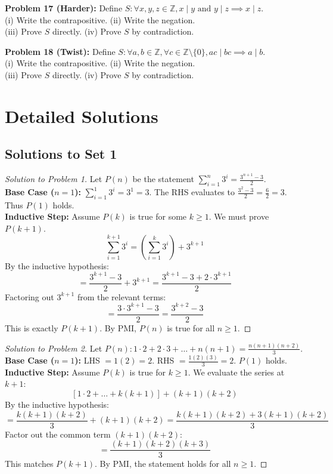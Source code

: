 \documentclass{article}
\begin{document}
\noindent\textbf{Problem 17 (Harder):} Define $S: \forall x,y,z \in \mathbb{Z}, x \mid y \text{ and } y \mid z \implies x \mid z$. \\
(i) Write the contrapositive. (ii) Write the negation. \\
(iii) Prove $S$ directly. (iv) Prove $S$ by contradiction.

\noindent\textbf{Problem 18 (Twist):} Define $S: \forall a,b \in \mathbb{Z}, \forall c \in \mathbb{Z} \setminus \{0\}, ac \mid bc \implies a \mid b$. \\
(i) Write the contrapositive. (ii) Write the negation. \\
(iii) Prove $S$ directly. (iv) Prove $S$ by contradiction.

\newpage
\section{Detailed Solutions}

\subsection{Solutions to Set 1}
\begin{proof}[Solution to Problem 1]
Let $P(n)$ be the statement $\sum_{i=1}^n 3^i = \frac{3^{n+1}-3}{2}$. \\
\textbf{Base Case ($n=1$):} $\sum_{i=1}^1 3^i = 3^1 = 3$. The RHS evaluates to $\frac{3^2-3}{2} = \frac{6}{2} = 3$. Thus $P(1)$ holds. \\
\textbf{Inductive Step:} Assume $P(k)$ is true for some $k \ge 1$. We must prove $P(k+1)$.
\[ \sum_{i=1}^{k+1} 3^i = \left( \sum_{i=1}^k 3^i \right) + 3^{k+1} \]
By the inductive hypothesis:
\[ = \frac{3^{k+1}-3}{2} + 3^{k+1} = \frac{3^{k+1}-3 + 2 \cdot 3^{k+1}}{2} \]
Factoring out $3^{k+1}$ from the relevant terms:
\[ = \frac{3 \cdot 3^{k+1} - 3}{2} = \frac{3^{k+2}-3}{2} \]
This is exactly $P(k+1)$. By PMI, $P(n)$ is true for all $n \ge 1$.
\end{proof}

\begin{proof}[Solution to Problem 2]
Let $P(n): 1 \cdot 2 + 2 \cdot 3 + \dots + n(n+1) = \frac{n(n+1)(n+2)}{3}$. \\
\textbf{Base Case ($n=1$):} LHS $= 1(2) = 2$. RHS $= \frac{1(2)(3)}{3} = 2$. $P(1)$ holds. \\
\textbf{Inductive Step:} Assume $P(k)$ is true for $k \ge 1$. We evaluate the series at $k+1$:
\[ \left[ 1 \cdot 2 + \dots + k(k+1) \right] + (k+1)(k+2) \]
By the inductive hypothesis:
\[ = \frac{k(k+1)(k+2)}{3} + (k+1)(k+2) = \frac{k(k+1)(k+2) + 3(k+1)(k+2)}{3} \]
Factor out the common term $(k+1)(k+2)$:
\[ = \frac{(k+1)(k+2)(k+3)}{3} \]
This matches $P(k+1)$. By PMI, the statement holds for all $n \ge 1$.
\end{proof}
\end{document}
